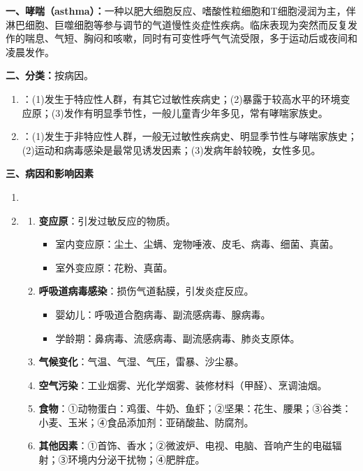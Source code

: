 \begin{keybox}
\textbf{一、哮喘（asthma）：}一种以肥大细胞反应、嗜酸性粒细胞和T细胞浸润为主，伴淋巴细胞、巨噬细胞等参与调节的气道慢性炎症性疾病。临床表现为突然而反复发作的喘息、气短、胸闷和咳嗽，同时有可变性呼气气流受限，多于运动后或夜间和凌晨发作。

\textbf{二、分类：}按病因。
\begin{enumerate}[leftmargin=*]
    \item {}：(1)发生于特应性人群，有其它过敏性疾病史；(2)暴露于较高水平的环境变应原；(3)发作有明显季节性，一般儿童青少年多见，常有哮喘家族史。
    \item {}：(1)发生于非特应性人群，一般无过敏性疾病史、明显季节性与哮喘家族史；(2)运动和病毒感染是最常见诱发因素；(3)发病年龄较晚，女性多见。
\end{enumerate}

\textbf{三、病因和影响因素}
\begin{enumerate}[leftmargin=*]
    \item {}
    \item {}
    \begin{enumerate}
        \item \textbf{变应原}：引发过敏反应的物质。
        \begin{itemize}
            \item 室内变应原：尘土、尘螨、宠物唾液、皮毛、病毒、细菌、真菌。
            \item 室外变应原：花粉、真菌。
        \end{itemize}
        \item \textbf{呼吸道病毒感染}：损伤气道黏膜，引发炎症反应。
        \begin{itemize}
            \item 婴幼儿：呼吸道合胞病毒、副流感病毒、腺病毒。
            \item 学龄期：鼻病毒、流感病毒、副流感病毒、肺炎支原体。
        \end{itemize}
        \item \textbf{气候变化}：气温、气湿、气压，雷暴、沙尘暴。
        \item \textbf{空气污染}：工业烟雾、光化学烟雾、装修材料（甲醛）、烹调油烟。
        \item \textbf{食物}：①动物蛋白：鸡蛋、牛奶、鱼虾；②坚果：花生、腰果；③谷类：小麦、玉米；④食品添加剂：亚硝酸盐、防腐剂。
        \item \textbf{其他因素}：①首饰、香水；②微波炉、电视、电脑、音响产生的电磁辐射；③环境内分泌干扰物；④肥胖症。
    \end{enumerate}
\end{enumerate}


\end{keybox}
